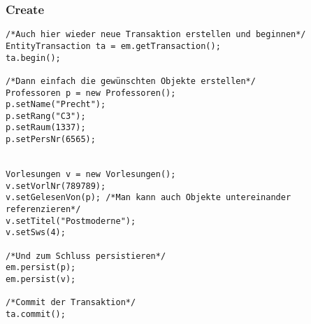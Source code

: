 \subsubsection{Create}
\begin{lstlisting}[caption={Neue Entities generieren mit JPA}]
/*Auch hier wieder neue Transaktion erstellen und beginnen*/
EntityTransaction ta = em.getTransaction();
ta.begin();

/*Dann einfach die gewünschten Objekte erstellen*/
Professoren p = new Professoren();
p.setName("Precht");
p.setRang("C3");
p.setRaum(1337);
p.setPersNr(6565);


Vorlesungen v = new Vorlesungen();
v.setVorlNr(789789);
v.setGelesenVon(p); /*Man kann auch Objekte untereinander referenzieren*/
v.setTitel("Postmoderne");
v.setSws(4);

/*Und zum Schluss persistieren*/
em.persist(p);
em.persist(v);

/*Commit der Transaktion*/
ta.commit();
\end{lstlisting}

